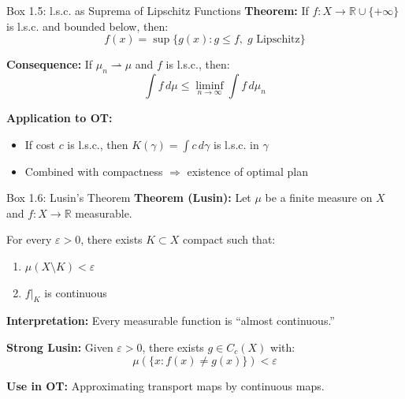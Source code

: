\documentclass[aspectratio=169]{beamer}
\newcommand{\R}{\mathbb{R}}
\begin{document}
\begin{frame}{Box 1.5: l.s.c. as Suprema of Lipschitz Functions}
\textbf{Theorem:} If $f: X \to \R \cup \{+\infty\}$ is l.s.c. and bounded below, then:
\[
f(x) = \sup \{ g(x) : g \leq f, \; g \text{ Lipschitz} \}
\]

\vspace{0.3cm}
\textbf{Consequence:} If $\mu_n \rightharpoonup \mu$ and $f$ is l.s.c., then:
\[
\int f \, d\mu \leq \liminf_{n \to \infty} \int f \, d\mu_n
\]

\vspace{0.3cm}
\textbf{Application to OT:}
\begin{itemize}
    \item If cost $c$ is l.s.c., then $K(\gamma) = \int c \, d\gamma$ is l.s.c. in $\gamma$
    \item Combined with compactness $\Rightarrow$ existence of optimal plan
\end{itemize}
\end{frame}

\begin{frame}{Box 1.6: Lusin's Theorem}
\textbf{Theorem (Lusin):} Let $\mu$ be a finite measure on $X$ and $f: X \to \R$ measurable.

For every $\varepsilon > 0$, there exists $K \subset X$ compact such that:
\begin{enumerate}
    \item $\mu(X \setminus K) < \varepsilon$
    \item $f|_K$ is continuous
\end{enumerate}

\vspace{0.4cm}
\textbf{Interpretation:} Every measurable function is ``almost continuous.''

\vspace{0.4cm}
\textbf{Strong Lusin:} Given $\varepsilon > 0$, there exists $g \in C_c(X)$ with:
\[
\mu(\{x : f(x) \neq g(x)\}) < \varepsilon
\]

\vspace{0.3cm}
\textbf{Use in OT:} Approximating transport maps by continuous maps.
\end{frame}
\end{document}
